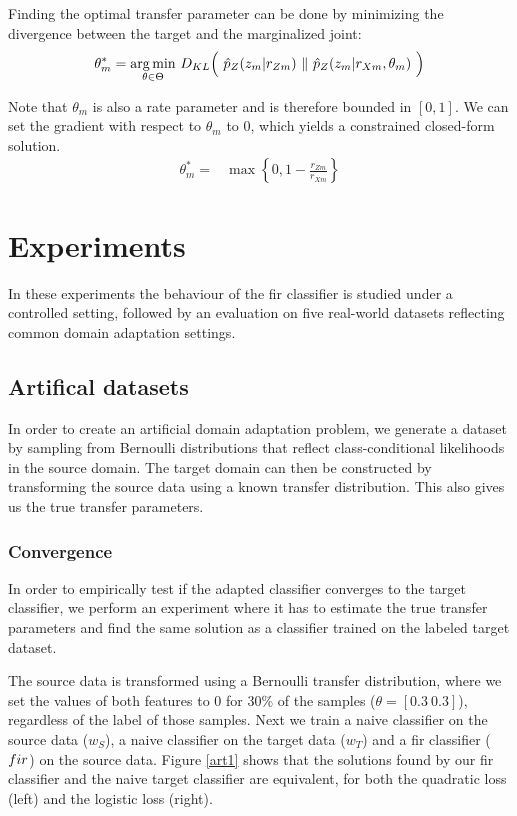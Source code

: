 \documentclass[twoside,11pt]{article}
\begin{document}
Finding the optimal transfer parameter can be done by minimizing the divergence between the target and the marginalized joint: 
\begin{align}
	{\bf \theta}_{m}^{*} = \underset{\theta \in \Theta}{\arg \min} \ D_{KL}\Big( \ \hat{p}_{Z}(z_m|r_{Zm}) \ \|\ \hat{p}_{Z}(z_m|r_{Xm}, \theta_m) \ \Big) \nonumber
\end{align}

Note that $\theta_m$ is also a rate parameter and is therefore bounded in $[0,1]$. We can set the gradient with respect to $\theta_m$ to 0, which yields a constrained closed-form solution.
\begin{align}
	\theta_{m}^{*} =& \max \left\{0, 1-\frac{r_{Zm}}{r_{Xm}} \label{theta_star} \right\}
\end{align}

\section{Experiments}
In these experiments the behaviour of the {\sc fir} classifier is studied under a controlled setting, followed by an evaluation on five real-world datasets reflecting common domain adaptation settings.

\subsection{Artifical datasets}
In order to create an artificial domain adaptation problem, we generate a dataset by sampling from Bernoulli distributions that reflect class-conditional likelihoods in the source domain. The target domain can then be constructed by transforming the source data using a known transfer distribution. This also gives us the true transfer parameters.

\subsubsection{Convergence}
In order to empirically test if the adapted classifier converges to the target classifier, we perform an experiment where it has to estimate the true transfer parameters and find the same solution as a classifier trained on the labeled target dataset.

The source data is transformed using a Bernoulli transfer distribution, where we set the values of both features to 0 for 30\% of the samples ($\theta= [0.3 \ 0.3]$), regardless of the label of those samples. Next we train a naive classifier on the source data ($w_{S}$), a naive classifier on the target data ($w_{T}$) and a {\sc fir} classifier (${\sc fir}$) on the source data. Figure \ref{art1} shows that the solutions found by our {\sc fir} classifier and the naive target classifier are equivalent, for both the quadratic loss (left) and the logistic loss (right).
\end{document}
